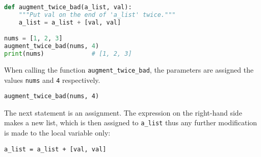 
\begin{lstlisting}[language=Python,caption={Python function assignment example.}, label={lst:python-augment-twice-bad}]
def augment_twice_bad(a_list, val):
    """Put val on the end of 'a_list' twice."""
    a_list = a_list + [val, val]

nums = [1, 2, 3]
augment_twice_bad(nums, 4)
print(nums)             # [1, 2, 3]
\end{lstlisting}


When calling the function \texttt{augment\_twice\_bad}, the parameters are assigned the values \texttt{nums} and \texttt{4} respectively. 

\begin{center}
\texttt{augment\_twice\_bad(nums, 4)}
\end{center}

\begin{center}
\end{center}


The next statement is an assignment. The expression on the right-hand side makes a new list, which is then assigned to \texttt{a\_list} thus any further modification is made to the local variable only:

\begin{center}
\texttt{a\_list = a\_list + [val, val]}
\end{center}

